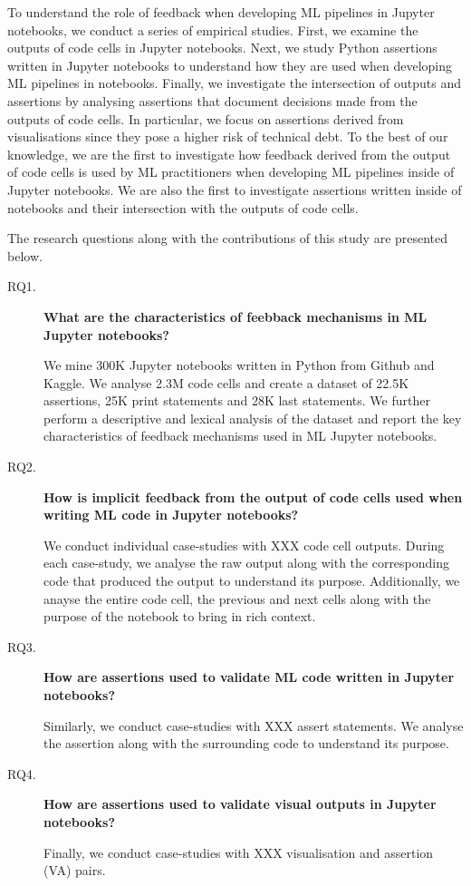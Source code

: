 To understand the role of feedback when developing ML pipelines in Jupyter notebooks, we conduct a series of  empirical studies. First, we examine the outputs of code cells in Jupyter notebooks. Next, we study Python assertions written in Jupyter notebooks to understand how they are used when developing ML pipelines in notebooks. Finally, we investigate the intersection of outputs and assertions by analysing  assertions that document decisions made from the outputs of code cells. In particular, we focus on assertions derived from visualisations since they pose a higher risk of technical debt. To the best of our knowledge, we are the first to investigate how feedback derived from the output of code cells is used by ML practitioners when developing ML pipelines inside of Jupyter notebooks. We are also the first to investigate assertions written inside of notebooks and their intersection with the outputs of code cells.

The research questions along with the contributions of this study are presented below.

\begin{description}
  \item[RQ1.] \textbf{What are the characteristics of feebback mechanisms in ML Jupyter notebooks?}

  We mine 300K Jupyter notebooks written in Python from Github and Kaggle. We analyse 2.3M code cells and create a dataset of 22.5K assertions, 25K print statements and 28K last statements. We further perform a descriptive and lexical analysis of the dataset and report the key characteristics of feedback mechanisms used in ML Jupyter notebooks.
  

  \item[RQ2.] \textbf{How is implicit feedback from the output of code cells used when writing ML code in Jupyter notebooks?}

  We conduct individual case-studies with XXX code cell outputs. During each case-study, we analyse the raw output along with the corresponding code that produced the output to understand its purpose. Additionally, we anayse the entire code cell, the previous and next cells along with the purpose of the notebook to bring in rich context.

  \item[RQ3.] \textbf{How are assertions used to validate ML code written in Jupyter notebooks?}

  Similarly, we conduct case-studies with XXX assert statements. We analyse the assertion along with the surrounding code to understand its purpose.

  \item[RQ4.] \textbf{How are assertions used to validate visual outputs in Jupyter notebooks?}

  Finally, we conduct case-studies with XXX visualisation and assertion (VA) pairs.
\end{description}

